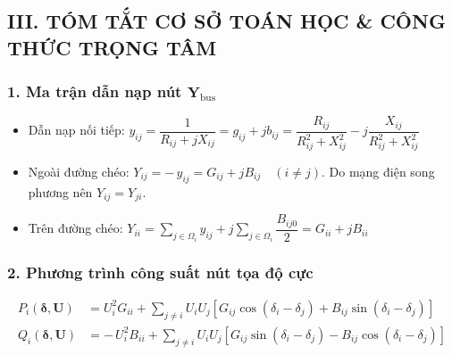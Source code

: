 \documentclass[10.5pt,a4paper]{article}
\begin{document}
\clearpage

\subsection*{III. TÓM TẮT CƠ SỞ TOÁN HỌC \& CÔNG THỨC TRỌNG TÂM}
\vspace{-4pt}

\subsubsection*{1. Ma trận dẫn nạp nút $\mathbf{Y}_{\text{bus}}$}
\vspace{-4pt}
\begin{itemize}\setlength{\itemsep}{1pt}\setlength{\parskip}{0pt}
    \item Dẫn nạp nối tiếp: $y_{ij} = \dfrac{1}{R_{ij} + jX_{ij}} = g_{ij} + jb_{ij} = \dfrac{R_{ij}}{R_{ij}^2 + X_{ij}^2} - j \dfrac{X_{ij}}{R_{ij}^2 + X_{ij}^2}$
    \item Ngoài đường chéo: $Y_{ij} = -\, y_{ij} = G_{ij} + jB_{ij} \quad (i \ne j)$. Do mạng điện song phương nên $Y_{ij} = Y_{ji}$.
    \item Trên đường chéo: $Y_{ii} = \sum_{j \in \Omega_i} y_{ij} + j \sum_{j \in \Omega_i} \dfrac{B_{ij0}}{2} = G_{ii} + jB_{ii}$
\end{itemize}

\vspace{-4pt}
\subsubsection*{2. Phương trình công suất nút tọa độ cực}
\vspace{-4pt}
\begin{align}
P_i(\boldsymbol{\delta}, \mathbf{U}) &= U_i^2 G_{ii} + \sum_{j \ne i} U_i U_j \left[ G_{ij} \cos(\delta_i - \delta_j) + B_{ij} \sin(\delta_i - \delta_j) \right] \\
Q_i(\boldsymbol{\delta}, \mathbf{U}) &= -\, U_i^2 B_{ii} + \sum_{j \ne i} U_i U_j \left[ G_{ij} \sin(\delta_i - \delta_j) - B_{ij} \cos(\delta_i - \delta_j) \right]
\end{align}

\vspace{-6pt}
\end{document}
